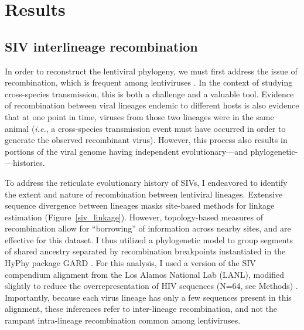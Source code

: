 
\section{Results}

\subsection{SIV interlineage recombination}
In order to reconstruct the lentiviral phylogeny, we must first address the issue of recombination, which is frequent among lentiviruses \citep{chen2006high}.
In the context of studying cross-species transmission, this is both a challenge and a valuable tool.
Evidence of recombination between viral lineages endemic to different hosts is also evidence that at one point in time, viruses from those two lineages were in the same animal (\textit{i.e.}, a cross-species transmission event must have occurred in order to generate the observed recombinant virus).
However, this process also results in portions of the viral genome having independent evolutionary---and phylogenetic-—histories.

To address the reticulate evolutionary history of SIVs, I endeavored to identify the extent and nature of recombination between lentiviral lineages.
Extensive sequence divergence between lineages masks site-based methods for linkage estimation (Figure~\ref{siv_linkage}).
However, topology-based measures of recombination allow for “borrowing” of information across nearby sites, and are effective for this dataset.
I thus utilized a phylogenetic model to group segments of shared ancestry separated by recombination breakpoints instantiated in the HyPhy package GARD \citep{kosakovsky2006gard}.
For this analysis, I used a version of the SIV compendium alignment from the Los Alamos National Lab (LANL), modified slightly to reduce the overrepresentation of HIV sequences (N=64, see Methods) \citep{los2012hiv}.
Importantly, because each virus lineage has only a few sequences present in this alignment, these inferences refer to inter-lineage recombination, and not the rampant intra-lineage recombination common among lentiviruses.

